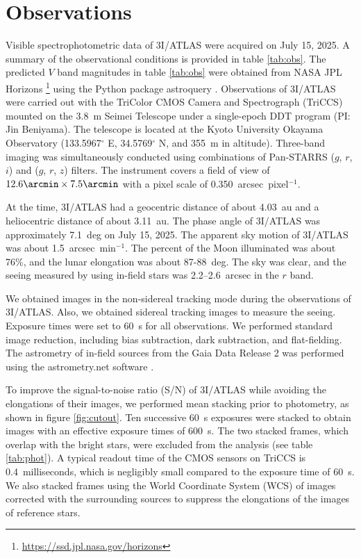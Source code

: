 \documentclass[]{pasj02}
\newcommand\I{3I/ATLAS\xspace}
\begin{document}
\section{Observations}\label{sec:obs}
Visible spectrophotometric data of \I were acquired on July 15, 2025.
A summary of the observational conditions is provided in table \ref{tab:obs}.
The predicted $V$ band magnitudes in table \ref{tab:obs} were obtained from NASA JPL Horizons \footnote{\url{https://ssd.jpl.nasa.gov/horizons}} using the Python package astroquery \citep{Ginsburg2019}.
Observations of \I were carried out with the TriColor CMOS Camera and Spectrograph (TriCCS) mounted on the 3.8~m Seimei Telescope \citep{Kurita2020} 
under a single-epoch DDT program (PI: Jin Beniyama).
The telescope is located at the Kyoto University Okayama Observatory (133.5967$^\circ$ E, 34.5769$^\circ$ N, and 355~m in altitude).
Three-band imaging was simultaneously conducted using combinations of Pan-STARRS ($g$, $r$, $i$) and ($g$, $r$, $z$) filters.
The instrument covers a field of view of $12.6\arcmin \times 7.5\arcmin$ with a pixel scale of 0.350~arcsec~pixel$^{-1}$.

At the time, \I had a geocentric distance of about 4.03~au and a heliocentric distance of about 3.11~au.
The phase angle of \I was approximately 7.1~deg on July 15, 2025.
The apparent sky motion of \I was about 1.5~arcsec~min$^{-1}$.
The percent of the Moon illuminated was about 76\%, and the lunar elongation was about 87-88~deg.
The sky was clear, and the seeing measured by using in-field stars was 2.2--2.6~arcsec in the $r$ band.

We obtained images in the non-sidereal tracking mode during the observations of \I.
Also, we obtained sidereal tracking images to measure the seeing.
Exposure times were set to 60~s for all observations.
We performed standard image reduction, including bias subtraction, dark subtraction, and flat-fielding.
The astrometry of in-field sources from the Gaia Data Release 2 was performed using the astrometry.net software \citep{Lang2010}.

To improve the signal-to-noise ratio (S/N) of \I while avoiding the elongations of their images, we performed mean stacking prior to photometry, as shown in figure \ref{fig:cutout}.
Ten successive 60~s exposures were stacked to obtain images with an effective exposure times of 600~s.
The two stacked frames, which overlap with the bright stars, were excluded from the analysis (see table \ref{tab:phot}).
A typical readout time of the CMOS sensors on TriCCS is 0.4~milliseconds,
which is negligibly small compared to the exposure time of 60~s.
We also stacked frames using the World Coordinate System (WCS) of images corrected with the surrounding sources to suppress the elongations of the images of reference stars.
\end{document}
